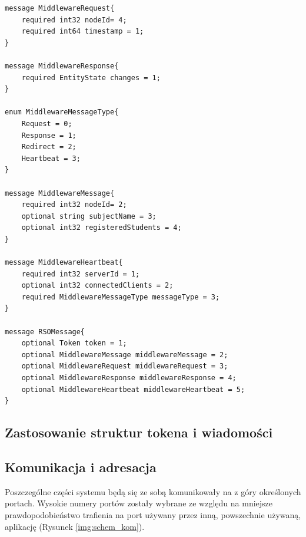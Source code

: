 {\begin{lstlisting}
message MiddlewareRequest{
	required int32 nodeId= 4;
    required int64 timestamp = 1;
}

message MiddlewareResponse{
    required EntityState changes = 1;
}

enum MiddlewareMessageType{
    Request = 0;
    Response = 1;
    Redirect = 2;
    Heartbeat = 3;
}

message MiddlewareMessage{
	required int32 nodeId= 2;
    optional string subjectName = 3;
    optional int32 registeredStudents = 4;    
}

message MiddlewareHeartbeat{
    required int32 serverId = 1;
    optional int32 connectedClients = 2;
    required MiddlewareMessageType messageType = 3;
}

message RSOMessage{
    optional Token token = 1;
    optional MiddlewareMessage middlewareMessage = 2;
    optional MiddlewareRequest middlewareRequest = 3;
    optional MiddlewareResponse middlewareResponse = 4;
    optional MiddlewareHeartbeat middlewareHeartbeat = 5;
}
\end{lstlisting}

\subsection[Zastosowanie struktur tokena i wiadomości]{Zastosowanie struktur tokena i wiadomości}

\subsection[Komunikacja i adresacja]{Komunikacja i adresacja}

\par{Poszczególne części systemu będą się ze sobą komunikowały na z góry określonych portach. Wysokie numery portów zostały wybrane ze względu na mniejsze prawdopodobieństwo trafienia na port używany przez inną, powszechnie używaną, aplikację (Rysunek \ref{img:schem_kom}).}

}
